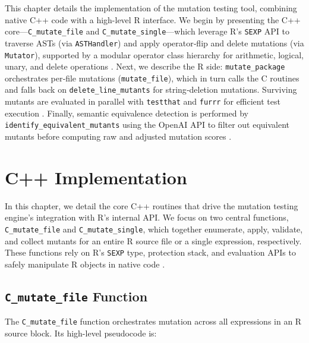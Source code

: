 

\begin{chapterabstract}
This chapter details the implementation of the mutation testing tool, combining native C++ code with a high-level R interface. We begin by presenting the C++ core—\texttt{C\_mutate\_file} and \texttt{C\_mutate\_single}—which leverage R’s \texttt{SEXP} API to traverse ASTs (via \texttt{ASTHandler}) and apply operator‐flip and delete mutations (via \texttt{Mutator}), supported by a modular operator class hierarchy for arithmetic, logical, unary, and delete operations \cite{rcore2024,hadley-r-internals-pairlists}. Next, we describe the R side: \texttt{mutate\_package} orchestrates per‐file mutations (\texttt{mutate\_file}), which in turn calls the C routines and falls back on \texttt{delete\_line\_mutants} for string‐deletion mutations. Surviving mutants are evaluated in parallel with \texttt{testthat} and \texttt{furrr} for efficient test execution \cite{wickham2011testthat,Vaughan2020furrr}. Finally, semantic equivalence detection is performed by \texttt{identify\_equivalent\_mutants} using the OpenAI API to filter out equivalent mutants before computing raw and adjusted mutation scores \cite{wickham2011httr,ooms2014jsonlite,openai2023api}.

\end{chapterabstract}

\section{C++ Implementation}

In this chapter, we detail the core C++ routines that drive the mutation testing engine’s integration with R’s internal API. We focus on two central functions, \texttt{C\_mutate\_file} and \texttt{C\_mutate\_single}, which together enumerate, apply, validate, and collect mutants for an entire R source file or a single expression, respectively. These functions rely on R’s \texttt{SEXP} type, protection stack, and evaluation APIs to safely manipulate R objects in native code \cite{rcore2024}.

\subsection{\texttt{C\_mutate\_file} Function}

The \texttt{C\_mutate\_file} function orchestrates mutation across all expressions in an R source block.  Its high-level pseudocode is:

